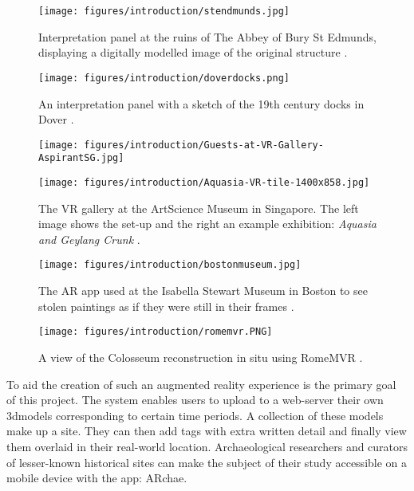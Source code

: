 \documentclass[12pt, a4paper]{article}
\begin{document}
\begin{figure}
\centering
    \texttt{[image: figures/introduction/stendmunds.jpg]}
    \caption{Interpretation panel at the ruins of The Abbey of Bury St Edmunds, displaying a digitally modelled image of the original structure \cite{preface:bury}.}
    \label{fig:stedmundschurch}
\end{figure}

\begin{figure}
    \centering
    \texttt{[image: figures/introduction/doverdocks.png]}
    \caption{An interpretation panel with a sketch of the 19th century docks in Dover \cite{preface:dover}.}
    \label{fig:iloveyoubryce}
\end{figure}

\begin{figure}[]
\centering
\begin{minipage}{.5\textwidth}
  \centering
  \texttt{[image: figures/introduction/Guests-at-VR-Gallery-AspirantSG.jpg]}
\end{minipage}%
\begin{minipage}{.5\textwidth}
  \centering
  \texttt{[image: figures/introduction/Aquasia-VR-tile-1400x858.jpg]}
\end{minipage}
\caption{The VR gallery at the ArtScience Museum in Singapore. The left image shows the set-up and the right an example exhibition: \textit{Aquasia and Geylang Crunk} \cite{preface:artscience}.}
\label{fig:singaporeartsci}
\end{figure}

\begin{figure}
    \centering
    \texttt{[image: figures/introduction/bostonmuseum.jpg]}
    \caption{The AR app used at the Isabella Stewart Museum in Boston to see stolen paintings as if they were still in their frames \cite{preface:bostommuseum}.}
    \label{fig:bostonmuseum}
\end{figure}

\begin{figure}
    \centering
    \texttt{[image: figures/introduction/romemvr.PNG]}
    \caption{A view of the Colosseum reconstruction in situ using RomeMVR \cite{existing:romemvr}.}
    \label{fig:romemv2intro}
\end{figure}

To aid the creation of such an augmented reality experience is the primary goal of this project. The system enables users to upload to a web-server their own \gls{3dmodel}s corresponding to certain time periods. A collection of these models make up a site. They can then add tags with extra written detail and finally view them overlaid in their real-world location. Archaeological researchers and curators of lesser-known historical sites can make the subject of their study accessible on a mobile device with the app: ARchae.
\end{document}
